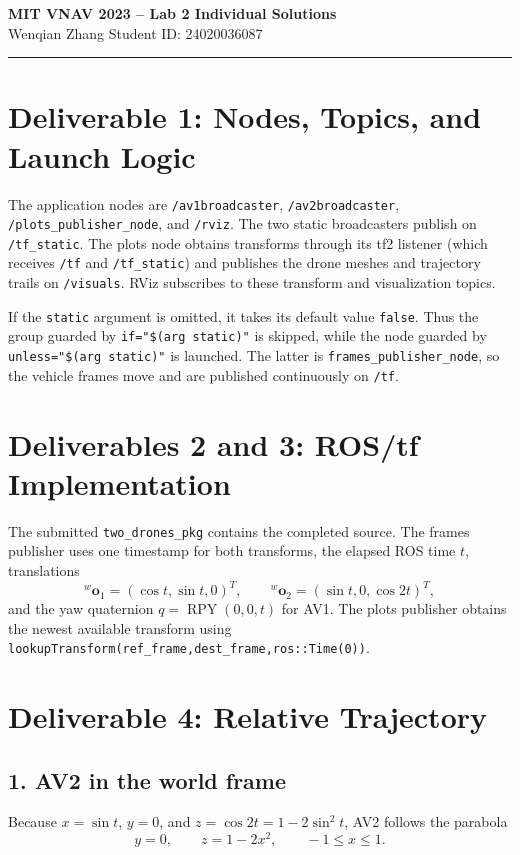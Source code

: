 \documentclass[11pt]{article}
\begin{document}
\begin{center}
{\LARGE\bfseries MIT VNAV 2023 -- Lab 2 Individual Solutions}\\[0.6em]
{\large Wenqian Zhang \quad Student ID: 24020036087}
\end{center}
\hrule

\section*{Deliverable 1: Nodes, Topics, and Launch Logic}
The application nodes are \texttt{/av1broadcaster},
\texttt{/av2broadcaster}, \texttt{/plots\_publisher\_node}, and
\texttt{/rviz}. The two static broadcasters publish on \texttt{/tf\_static}.
The plots node obtains transforms through its tf2 listener (which receives
\texttt{/tf} and \texttt{/tf\_static}) and publishes the drone meshes and
trajectory trails on \texttt{/visuals}. RViz subscribes to these transform and
visualization topics.

If the \texttt{static} argument is omitted, it takes its default value
\texttt{false}. Thus the group guarded by \texttt{if="\$(arg static)"} is
skipped, while the node guarded by \texttt{unless="\$(arg static)"} is
launched. The latter is \texttt{frames\_publisher\_node}, so the vehicle
frames move and are published continuously on \texttt{/tf}.

\section*{Deliverables 2 and 3: ROS/tf Implementation}
The submitted \texttt{two\_drones\_pkg} contains the completed source. The
frames publisher uses one timestamp for both transforms, the elapsed ROS time
\(t\), translations
\[
{}^{w}\bm{o}_1=(\cos t,\sin t,0)^T,\qquad
{}^{w}\bm{o}_2=(\sin t,0,\cos 2t)^T,
\]
and the yaw quaternion \(q=\operatorname{RPY}(0,0,t)\) for AV1. The plots
publisher obtains the newest available transform using
\texttt{lookupTransform(ref\_frame,dest\_frame,ros::Time(0))}.

\section*{Deliverable 4: Relative Trajectory}
\subsection*{1. AV2 in the world frame}
Because \(x=\sin t\), \(y=0\), and \(z=\cos 2t=1-2\sin^2 t\), AV2 follows
the parabola
\[
y=0,\qquad z=1-2x^2,\qquad -1\le x\le 1.
\]
\end{document}
